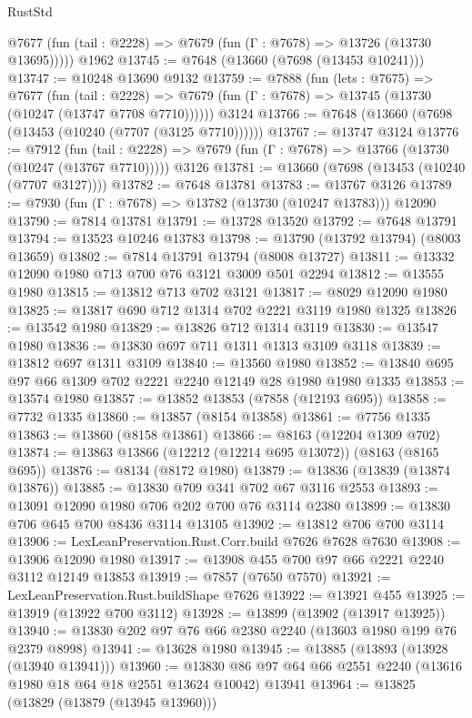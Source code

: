 \begin{lexlean}{RustStd}
\begin{coremodule}
      @7677 (fun (tail : @2228) => @7679 (fun (Γ : @7678) => @13726 (@13730 @13695)))))
    @1962
@13745 := @7648 (@13660 (@7698 (@13453 @10241)))
@13747 := @10248 @13690 @9132
@13759 := @7888
    (fun (lets : @7675) =>
    @7677
      (fun (tail : @2228) =>
      @7679 (fun (Γ : @7678) => @13745 (@13730 (@10247 (@13747 @7708 @7710))))))
    @3124
@13766 := @7648 (@13660 (@7698 (@13453 (@10240 (@7707 (@3125 @7710))))))
@13767 := @13747 @3124
@13776 := @7912
    (fun (tail : @2228) => @7679 (fun (Γ : @7678) => @13766 (@13730 (@10247 (@13767 @7710)))))
    @3126
@13781 := @13660 (@7698 (@13453 (@10240 (@7707 @3127))))
@13782 := @7648 @13781
@13783 := @13767 @3126
@13789 := @7930 (fun (Γ : @7678) => @13782 (@13730 (@10247 @13783))) @12090
@13790 := @7814 @13781
@13791 := @13728 @13520
@13792 := @7648 @13791
@13794 := @13523 @10246 @13783
@13798 := @13790 (@13792 @13794) (@8003 @13659)
@13802 := @7814 @13791 @13794 (@8008 @13727)
@13811 := @13332 @12090 @1980 @713 @700 @76 @3121 @3009 @501 @2294
@13812 := @13555 @1980
@13815 := @13812 @713 @702 @3121
@13817 := @8029 @12090 @1980
@13825 := @13817 @690 @712 @1314 @702 @2221 @3119 @1980 @1325
@13826 := @13542 @1980
@13829 := @13826 @712 @1314 @3119
@13830 := @13547 @1980
@13836 := @13830 @697 @711 @1311 @1313 @3109 @3118
@13839 := @13812 @697 @1311 @3109
@13840 := @13560 @1980
@13852 := @13840 @695 @97 @66 @1309 @702 @2221 @2240 @12149 @28 @1980 @1980 @1335
@13853 := @13574 @1980
@13857 := @13852 @13853 (@7858 (@12193 @695))
@13858 := @7732 @1335
@13860 := @13857 (@8154 @13858)
@13861 := @7756 @1335
@13863 := @13860 (@8158 @13861)
@13866 := @8163 (@12204 @1309 @702)
@13874 := @13863 @13866 (@12212 (@12214 @695 @13072)) (@8163 (@8165 @695))
@13876 := @8134 (@8172 @1980)
@13879 := @13836 (@13839 (@13874 @13876))
@13885 := @13830 @709 @341 @702 @67 @3116 @2553
@13893 := @13091 @12090 @1980 @706 @202 @700 @76 @3114 @2380
@13899 := @13830 @706 @645 @700 @8436 @3114 @13105
@13902 := @13812 @706 @700 @3114
@13906 := LexLeanPreservation.Rust.Corr.build @7626 @7628 @7630
@13908 := @13906 @12090 @1980
@13917 := @13908 @455 @700 @97 @66 @2221 @2240 @3112 @12149 @13853
@13919 := @7857 (@7650 @7570)
@13921 := LexLeanPreservation.Rust.buildShape @7626
@13922 := @13921 @455
@13925 := @13919 (@13922 @700 @3112)
@13928 := @13899 (@13902 (@13917 @13925))
@13940 := @13830 @202 @97 @76 @66 @2380 @2240 (@13603 @1980 @199 @76 @2379 @8998)
@13941 := @13628 @1980
@13945 := @13885 (@13893 (@13928 (@13940 @13941)))
@13960 := @13830 @86 @97 @64 @66 @2551 @2240 (@13616 @1980 @18 @64 @18 @2551 @13624 @10042) @13941
@13964 := @13825 (@13829 (@13879 (@13945 @13960)))

\end{coremodule}
\end{lexlean}
